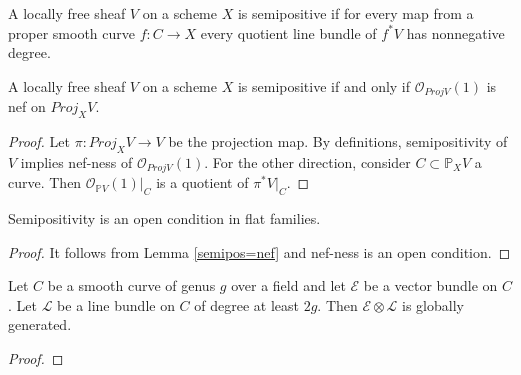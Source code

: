 \begin{definition}
A locally free sheaf $V$ on a scheme $X$ is semipositive if for every map from a proper smooth curve $f:C\to X$ every quotient line bundle of $f^*V$ has nonnegative degree.
\end{definition}

\begin{lemma}\label{semipos=nef}
A locally free sheaf $V$ on a scheme $X$ is semipositive if and only if $\mathcal{O}_{Proj V}(1)$ is nef on $Proj_XV$.
\end{lemma}
\begin{proof}
Let $\pi: Proj_X V\to V$ be the projection map. By definitions, semipositivity of $V$ implies nef-ness of $\mathcal{O}_{Proj V}(1)$. For the other direction, consider $C\subset \mathbb{P}_XV$ a curve. Then $\mathcal{O}_{\mathbb{P}V}(1)|_C$ is a quotient of $\pi^*V|_C$. 
\end{proof}

\begin{lemma}
Semipositivity is an open condition in flat families.
\end{lemma}

\begin{proof}
It follows from Lemma \ref{semipos=nef} and nef-ness is an open condition.
\end{proof}

\begin{lemma}\label{global_generation_of_specific_twist_on_curve}
Let $C$ be a smooth curve of genus $g$ over a field and let $\mathcal{E}$ be a vector bundle on $C$. Let $\mathcal{L}$ be a line bundle on $C$ of degree at least $2g$. Then $\mathcal{E}\otimes\mathcal{L}$ is globally generated.
\end{lemma}

\begin{proof}

\end{proof}


